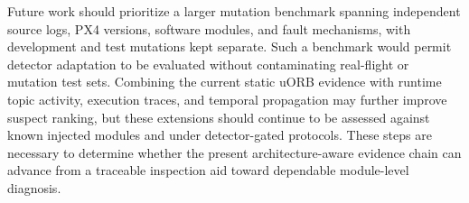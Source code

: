 Future work should prioritize a larger mutation benchmark spanning independent source logs, PX4 versions, software modules, and fault mechanisms, with development and test mutations kept separate. Such a benchmark would permit detector adaptation to be evaluated without contaminating real-flight or mutation test sets. Combining the current static uORB evidence with runtime topic activity, execution traces, and temporal propagation may further improve suspect ranking, but these extensions should continue to be assessed against known injected modules and under detector-gated protocols. These steps are necessary to determine whether the present architecture-aware evidence chain can advance from a traceable inspection aid toward dependable module-level diagnosis.
